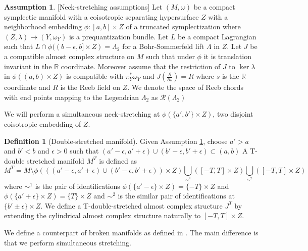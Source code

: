 \documentclass[11pt, oneside,dvipsnames]{amsart}
\renewcommand{\to}{\rightarrow}
\renewcommand{\to}{\rightarrow}
\newcommand{\<}{\langle}
\renewcommand{\>}{\rangle}
\newcommand{\bR}{\mathbb{R}}
\newcommand{\cR}{\mathcal{R}}
\newcommand{\sm}{\ensuremath{\setminus}}
\renewcommand{\to}{\rightarrow}
\newcommand{\dd}[1]{\frac{\partial}{\partial #1}}
\theoremstyle{definition}
\newtheorem{assum}[Theorem]{Assumption}
\theoremstyle{definition}
\newtheorem{defn}[Theorem]{Definition}
\numberwithin{equation}{subsection}
\begin{document}
\begin{assum}\label{assneck}[Neck-stretching assumptions]
Let $(M,\omega)$ be a compact symplectic manifold with a coisotropic separating hypersurface $Z$ with a neighborhood embedding $\phi: [a,b]\times Z$ of a truncated symplectization where   $(Z,\lambda) \to (Y,\omega_Y)$ is a prequantization bundle. Let $L$ be a compact Lagrangian such that $L \cap \phi ((b-\epsilon,b]\times Z)  = \Lambda_2$ for a Bohr-Sommerfeld lift $\Lambda$ in $Z$. Let $J$ be a compatible almost complex structure on $M$ such that under $\phi$ it is translation invariant in the $\bR$ coordinate. Moreover assume that the restriction of  $J$ to $\ker \lambda$ in $\phi((a,b)\times Z)$ is compatible with $\pi_Y^* \omega_Y$ and $J(\dd{s}) = R$ where $s$ is the $\bR$ coordinate and $R$ is the Reeb field on $Z$. We denote the space of Reeb chords with end points mapping to the Legendrian $\Lambda_2$ as $\cR(\Lambda_2)$


\end{assum}


We will perform a simultaneous neck-stretching at $\phi(\{a',b'\} \times Z )$, two disjoint coisotropic embedding of $Z$.  

\begin{defn}[Double-stretched manifold]
Given Assumption \ref{assneck}, choose $a'>a$ and $b'<b$ and $\epsilon >0$ such that $(a'-\epsilon , a'+\epsilon) \cup (b'-\epsilon, b'+\epsilon) \subset (a,b)$    A T-double stretched manifold $M^T$ is defined as 
\begin{equation*}
    M^T= M\sm \phi (((a'-\epsilon , a'+\epsilon) \cup (b'-\epsilon, b'+\epsilon)) \times Z) \bigcup_{\sim^1} ([-T,T] \times Z )\bigcup_{\sim^2}( [-T,T] \times Z  )
\end{equation*}
where $\sim^1$ is the pair of identifications $\phi(
\{a'-\epsilon\}\times Z
) = \{ -T\} \times Z$
and $\phi(
\{a'+\epsilon\}\times Z
) = \{ T\} \times Z$ and $\sim^2$ is the similar pair of identifications at $\{b'\pm \epsilon \} \times Z$. We define a T-double-stretched almost complex structure $J^T$ by extending the cylindrical almost complex structure naturally to $[-T,T] \times Z$.

\end{defn} 


\noindent We define a counterpart of broken manifolds as defined in \cite{floflip}. The main difference is that we perform simultaneous stretching. 
\end{document}
